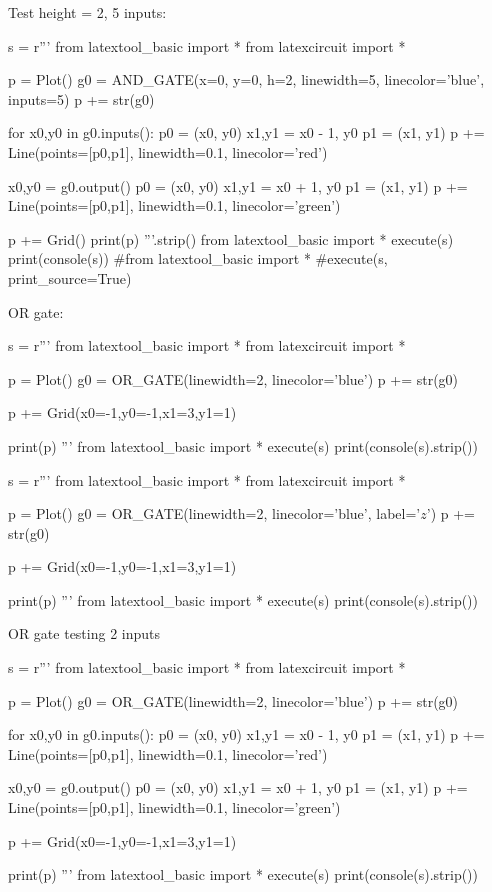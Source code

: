 Test height = 2, 5 inputs:
\begin{python}
s = r'''
from latextool_basic import *
from latexcircuit import *

p = Plot()
g0 = AND_GATE(x=0, y=0, h=2,
              linewidth=5, linecolor='blue', inputs=5)
p += str(g0)

for x0,y0 in g0.inputs():
    p0 = (x0, y0)
    x1,y1 = x0 - 1, y0
    p1 = (x1, y1)
    p += Line(points=[p0,p1], linewidth=0.1, linecolor='red')

x0,y0 = g0.output()
p0 = (x0, y0)
x1,y1 = x0 + 1, y0
p1 = (x1, y1)
p += Line(points=[p0,p1], linewidth=0.1, linecolor='green')

p += Grid()
print(p)
'''.strip()
from latextool_basic import *
execute(s)
print(console(s))
#from latextool_basic import *
#execute(s, print_source=True)
\end{python}
  


OR gate:
\begin{python}
s = r'''
from latextool_basic import *
from latexcircuit import *

p = Plot()
g0 = OR_GATE(linewidth=2, linecolor='blue')
p += str(g0)

p += Grid(x0=-1,y0=-1,x1=3,y1=1)

print(p)
'''
from latextool_basic import *
execute(s)
print(console(s).strip())
\end{python}


\begin{python}
s = r'''
from latextool_basic import *
from latexcircuit import *

p = Plot()
g0 = OR_GATE(linewidth=2, linecolor='blue', label='$z$')
p += str(g0)

p += Grid(x0=-1,y0=-1,x1=3,y1=1)

print(p)
'''
from latextool_basic import *
execute(s)
print(console(s).strip())
\end{python}




\newpage
OR gate testing 2 inputs
\begin{python}
s = r'''
from latextool_basic import *
from latexcircuit import *

p = Plot()
g0 = OR_GATE(linewidth=2, linecolor='blue')
p += str(g0)

for x0,y0 in g0.inputs():
    p0 = (x0, y0)
    x1,y1 = x0 - 1, y0
    p1 = (x1, y1)
    p += Line(points=[p0,p1], linewidth=0.1, linecolor='red')

x0,y0 = g0.output()
p0 = (x0, y0)
x1,y1 = x0 + 1, y0
p1 = (x1, y1)
p += Line(points=[p0,p1], linewidth=0.1, linecolor='green')

p += Grid(x0=-1,y0=-1,x1=3,y1=1)

print(p)
'''
from latextool_basic import *
execute(s)
print(console(s).strip())
\end{python}



